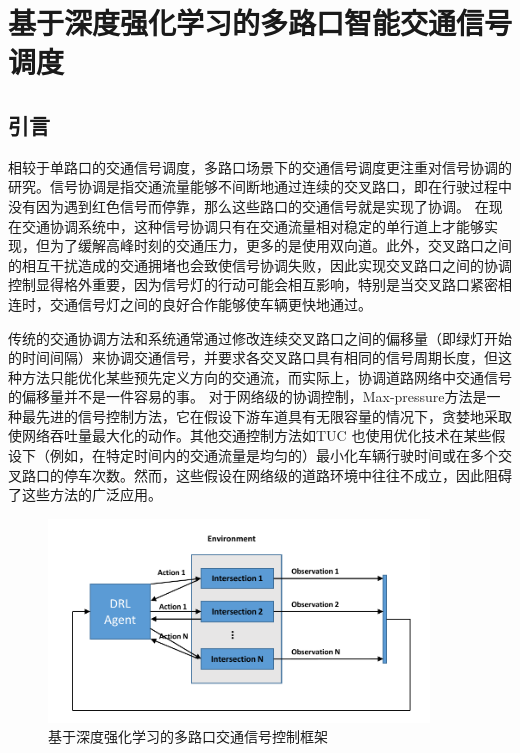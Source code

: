 
\chapter{基于深度强化学习的多路口智能交通信号调度}
\section{引言}
相较于单路口的交通信号调度，多路口场景下的交通信号调度更注重对信号协调的研究。信号协调是指交通流量能够不间断地通过连续的交叉路口，即在行驶过程中没有因为遇到红色信号而停靠，那么这些路口的交通信号就是实现了协调。
在现在交通协调系统中，这种信号协调只有在交通流量相对稳定的单行道上才能够实现，但为了缓解高峰时刻的交通压力，更多的是使用双向道。此外，交叉路口之间的相互干扰造成的交通拥堵也会致使信号协调失败，因此实现交叉路口之间的协调控制显得格外重要，因为信号灯的行动可能会相互影响，特别是当交叉路口紧密相连时，交通信号灯之间的良好合作能够使车辆更快地通过。

传统的交通协调方法\cite{koonce2008traffic}和系统\cite{hunt1981scoot,hunt1982scoot,lowrie1990scats}通常通过修改连续交叉路口之间的偏移量（即绿灯开始的时间间隔）来协调交通信号，并要求各交叉路口具有相同的信号周期长度，但这种方法只能优化某些预先定义方向的交通流\cite{gartner1991multi}，而实际上，协调道路网络中交通信号的偏移量并不是一件容易的事。
对于网络级的协调控制，Max-pressure\cite{varaiya2013max}方法是一种最先进的信号控制方法，它在假设下游车道具有无限容量的情况下，贪婪地采取使网络吞吐量最大化的动作。其他交通控制方法如TUC\cite{diakaki2002multivariable} 也使用优化技术在某些假设下（例如，在特定时间内的交通流量是均匀的）最小化车辆行驶时间或在多个交叉路口的停车次数。然而，这些假设在网络级的道路环境中往往不成立，因此阻碍了这些方法的广泛应用。

\begin{figure}[htb]
  \includegraphics[width=0.9\textwidth]{fig/multi-intersection-RL.pdf}
  \caption{基于深度强化学习的多路口交通信号控制框架}
  \label{fig:multi-tsc-rl}
\end{figure}

